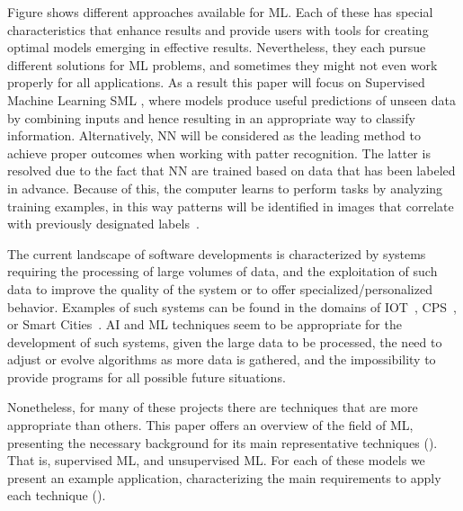 Figure   shows different approaches available for \ac{ML}. Each of these has special characteristics that enhance results and provide users with tools for creating optimal models emerging in effective results.  Nevertheless, they each pursue different solutions for  \ac{ML} problems, and sometimes they might not even work properly for all applications. As a result this paper will focus on Supervised Machine Learning  \ac{SML} , where models produce useful predictions of unseen data by combining inputs and hence resulting in an appropriate way to classify information. Alternatively, \ac{NN}  will be considered as the leading method to achieve proper outcomes when working with patter recognition. The latter is resolved due to the fact that  \ac{NN}  are trained based on data that has been labeled in advance. Because of this, the computer learns to perform tasks by analyzing training examples, in this way patterns will be identified in images that correlate with previously designated labels~\cite{mit17}. 

The current landscape of software developments is characterized by systems requiring the processing 
of large volumes of data, and the exploitation of such data to improve the quality of the system or to 
offer specialized/personalized behavior. Examples of such systems can be found in the domains of 
\ac{IOT}~\cite{mattern10}, \acs{CPS}~\cite{holzl15}, or Smart Cities~\cite{zanella14}. \ac{AI} and 
\ac{ML} techniques seem to be appropriate for the development of such systems, given the large 
data to be processed, the need to adjust or evolve algorithms as more data is gathered, and the 
impossibility to provide programs for all possible future situations. 

Nonetheless, for many of these projects there are techniques that are more appropriate than others.
This paper offers an overview of the field of \ac{ML}, presenting the necessary background for its 
main representative techniques (). That is, supervised \ac{ML}, and unsupervised 
\ac{ML}. For each of these models we present an example application, characterizing the main 
requirements to apply each technique ().


\endinput

